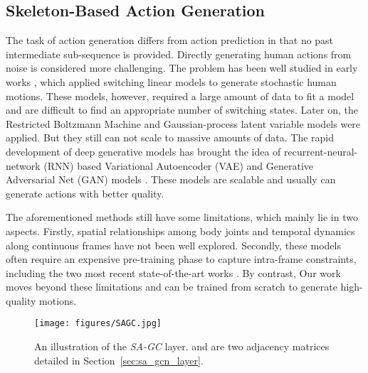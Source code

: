 \documentclass[runningheads]{llncs}
\begin{document}
\subsection{Skeleton-Based Action Generation}
The task of action generation differs from action prediction \cite{barsoum2018hp} in that no past intermediate sub-sequence is provided. Directly generating human actions from noise is considered more challenging. The problem has been well studied in early works \cite{bissacco2009hybrid,oh2005learning,pavlovic2001learning}, which applied switching linear models to generate stochastic human motions. These models, however, required a large amount of data to fit a model and are difficult to find an appropriate number of switching states. Later on, the Restricted Boltzmann Machine \cite{taylor2011two} and Gaussian-process latent variable models \cite{urtasun2008topologically,wang2009optimizing,wang2010optimizing} were applied. But they still can not scale to massive amounts of data. 
The rapid development of deep generative models has brought the idea of recurrent-neural-network (RNN) based Variational Autoencoder (VAE) \cite{kingma2013auto} and Generative Adversarial Net (GAN) models \cite{goodfellow2014generative,cai2018deep,kiasari2018human,wang2019combining,wang2019learning,wichers2018hierarchical,zhao2020feature}. These models are scalable and usually can generate actions with better quality. 


The aforementioned methods still have some limitations, which mainly lie in two aspects. Firstly, spatial relationships among body joints and temporal dynamics along continuous frames have not been well explored. 
Secondly, these models often require an expensive pre-training phase to capture intra-frame constraints, including the two most recent state-of-the-art works \cite{cai2018deep,wang2019learning}. By contrast, Our work moves beyond these limitations and can be trained from scratch to generate high-quality motions.

\begin{wrapfigure}{R}{0.5\linewidth}
    \centering 
    \texttt{[image: figures/SAGC.jpg]} 
    \caption{\small{An illustration of the {\it SA-GC} layer.  and  are two adjacency matrices detailed in Section~\ref{sec:sa_gcn_layer}.}} 
    \label{fig:sa_gc} 
\end{wrapfigure}
\end{document}

